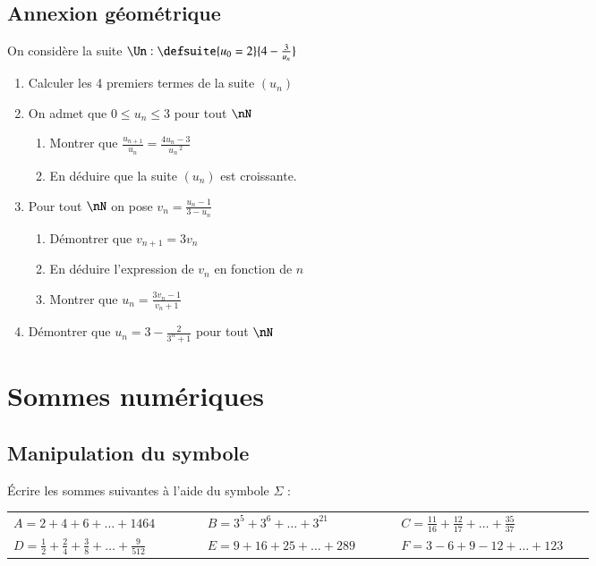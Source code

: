 \documentclass[oneside,12pt]{article}          %
\begin{document}
\subsection{Annexion géométrique}
On considère la suite $\Un:\defsuite{u_0=2}{4-\frac{3}{u_n}}$
\begin{enumerate}
	\item Calculer les 4 premiers termes de la suite $(u_n)$
	\item On admet que $0\leq u_n\leq3$ pour tout $\nN$
	\begin{enumerate}
		\item Montrer que $\frac{u_{n+1}}{u_n}=\frac{4u_n-3}{u_n\,^2}$
		\item En déduire que la suite $(u_n)$ est croissante.
	\end{enumerate}
	\item Pour tout $\nN$ on pose $v_n=\frac{u_n-1}{3-u_n}$
	\begin{enumerate}
		\item Démontrer que $v_{n+1}=3v_n$
		\item En déduire l'expression de $v_n$ en fonction de $n$
		\item Montrer que $u_n=\frac{3v_n-1}{v_n+1}$
	\end{enumerate}
	\item Démontrer que $u_n=3-\frac{2}{3^n+1}$ pour tout $\nN$
\end{enumerate}




\section{Sommes numériques}

\subsection{Manipulation du symbole}
Écrire les sommes suivantes à l'aide du symbole $\Sigma$ : \\
\renewcommand{\arraystretch}{1.6}
\begin{tabular}{p{0.3\linewidth} p{0.3\linewidth} p{0.3\linewidth}}

    $A = 2+4+6+\ldots+1464$ & $B = 3^5+3^6+\ldots+3^{21}$ & $C = \frac{11}{16}+\frac{12}{17}+\ldots+\frac{35}{37}$\\
    $D = \frac{1}{2}+\frac{2}{4}+\frac{3}{8}+\ldots+\frac{9}{512}$ & $E = 9+16+25+\ldots+289$ & $F = 3-6+9-12+\ldots+123$    
\end{tabular}
\end{document}
